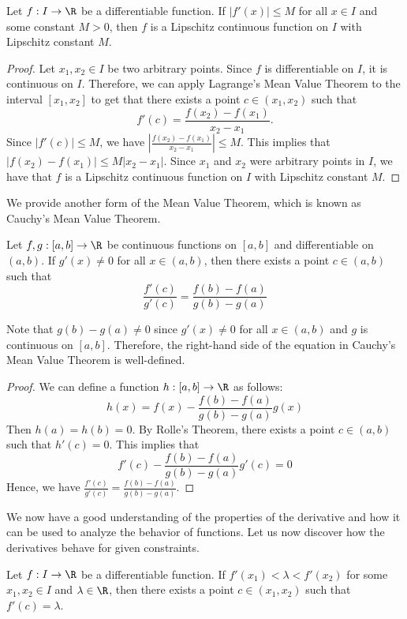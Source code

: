 \documentclass[openany]{book}
\begin{document}
\begin{corollary}
    Let $f: I \to \R$ be a differentiable function. If $|f'(x)| \leq M$ for all $x \in I$ and some constant $M > 0$, then $f$ is a Lipschitz continuous function on $I$ with Lipschitz constant $M$.
\end{corollary}
\begin{proof}
    Let $x_1, x_2 \in I$ be two arbitrary points. Since $f$ is differentiable on $I$, it is continuous on $I$. Therefore, we can apply Lagrange's Mean Value Theorem to the interval $[x_1, x_2]$ to get that there exists a point $c \in (x_1, x_2)$ such that
    \[
        f'(c) = \frac{f(x_2) - f(x_1)}{x_2 - x_1}.
    \]
    Since $|f'(c)| \leq M$, we have $\left|\frac{f(x_2) - f(x_1)}{x_2 - x_1}\right| \leq M$. This implies that $|f(x_2) - f(x_1)| \leq M|x_2 - x_1|$. Since $x_1$ and $x_2$ were arbitrary points in $I$, we have that $f$ is a Lipschitz continuous function on $I$ with Lipschitz constant $M$.
\end{proof}
We provide another form of the Mean Value Theorem, which is known as Cauchy's Mean Value Theorem.
\begin{mytheorem}
    Let $f, g: [a, b] \to \R$ be continuous functions on $[a, b]$ and differentiable on $(a, b)$. If $g'(x) \neq 0$ for all $x \in (a, b)$, then there exists a point $c \in (a, b)$ such that
    \[
        \frac{f'(c)}{g'(c)} = \frac{f(b) - f(a)}{g(b) - g(a)}
    \]
\end{mytheorem}
\begin{mynote}
    Note that $g(b) - g(a) \neq 0$ since $g'(x) \neq 0$ for all $x \in (a, b)$ and $g$ is continuous on $[a, b]$. Therefore, the right-hand side of the equation in Cauchy's Mean Value Theorem is well-defined.
\end{mynote}
\begin{proof}
    We can define a function $h: [a, b] \to \R$ as follows:
    \[
        h(x) = f(x) - \frac{f(b) - f(a)}{g(b) - g(a)} g(x)
    \]
    Then $h(a) = h(b) = 0$. By Rolle's Theorem, there exists a point $c \in (a, b)$ such that $h'(c) = 0$. This implies that
    \[
        f'(c) - \frac{f(b) - f(a)}{g(b) - g(a)} g'(c) = 0
    \]
    Hence, we have $\frac{f'(c)}{g'(c)} = \frac{f(b) - f(a)}{g(b) - g(a)}$.
\end{proof}
We now have a good understanding of the properties of the derivative and how it can be used to analyze the behavior of functions. Let us now discover how the derivatives behave for given constraints. 
\begin{mytheorem}
    Let $f: I \to \R$ be a differentiable function. If $f'(x_1) < \lambda < f'(x_2)$ for some $x_1, x_2 \in I$ and $\lambda \in \R$, then there exists a point $c \in (x_1, x_2)$ such that $f'(c) = \lambda$.
\end{mytheorem}
\end{document}

